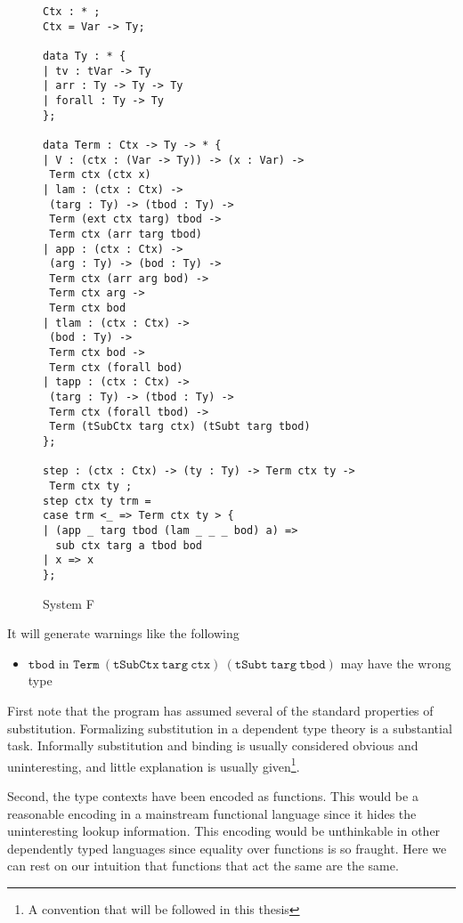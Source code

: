 \begin{figure}
\begin{lstlisting}[basicstyle={\ttfamily\tiny}]
Ctx : * ;
Ctx = Var -> Ty;
 
data Ty : * {
| tv : tVar -> Ty
| arr : Ty -> Ty -> Ty
| forall : Ty -> Ty
};
 
data Term : Ctx -> Ty -> * {
| V : (ctx : (Var -> Ty)) -> (x : Var) ->
 Term ctx (ctx x)
| lam : (ctx : Ctx) ->
 (targ : Ty) -> (tbod : Ty) ->
 Term (ext ctx targ) tbod ->
 Term ctx (arr targ tbod)
| app : (ctx : Ctx) ->
 (arg : Ty) -> (bod : Ty) ->
 Term ctx (arr arg bod) ->
 Term ctx arg ->
 Term ctx bod
| tlam : (ctx : Ctx) ->
 (bod : Ty) ->
 Term ctx bod ->
 Term ctx (forall bod)
| tapp : (ctx : Ctx) ->
 (targ : Ty) -> (tbod : Ty) ->
 Term ctx (forall tbod) ->
 Term (tSubCtx targ ctx) (tSubt targ tbod)
};
 
step : (ctx : Ctx) -> (ty : Ty) -> Term ctx ty ->
 Term ctx ty ;
step ctx ty trm =
case trm <_ => Term ctx ty > {
| (app _ targ tbod (lam _ _ _ bod) a) =>
  sub ctx targ a tbod bod
| x => x
};
\end{lstlisting}

\caption{System F}
\label{fig:ex-sysf}
\end{figure}

It will generate warnings like the following
\begin{itemize}
\item $\mathtt{tbod}$ in $\mathtt{Term\ (tSubCtx\ targ\ ctx)\ (tSubt\ targ\ \underline{tbod})}$
may have the wrong type 
\end{itemize}
First note that the program has assumed several of the standard properties of substitution.
Formalizing substitution in a dependent type theory is a substantial
task\cite{10.1145/3293880.3294101}.
Informally substitution and binding is usually considered obvious and uninteresting, and little explanation is usually given\footnote{A convention that will be followed in this thesis}.

Second, the type contexts have been encoded as functions.
This would be a reasonable encoding in a mainstream functional language since it hides the uninteresting lookup information.
This encoding would be unthinkable in other dependently typed languages since equality over functions is so fraught.
Here we can rest on our intuition that functions that act the same are the same.

